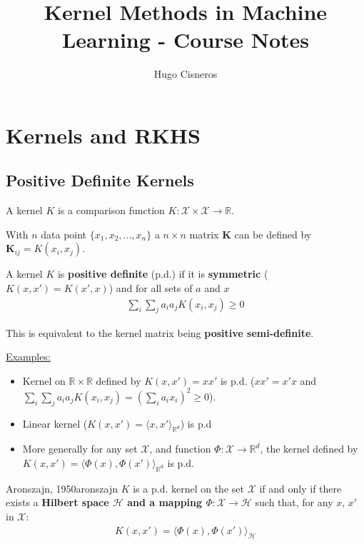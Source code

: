 \documentclass{article}
\title{Kernel Methods in Machine Learning - Course Notes}
\author{Hugo Cisneros}
\date{}
\begin{document}
\maketitle

\section{Kernels and RKHS}

\subsection{Positive Definite Kernels}

\begin{Definition}{}{}
    A kernel $K$ is  a comparison function $K: \mathcal{X}\times\mathcal{X}
 \rightarrow \mathbb{R}$.


    With $n$ data point $\{x_1, x_2, ..., x_n\}$ a $n \times n$ matrix 
    $\mathbf{K}$ can be defined by $\mathbf{K}_{ij} = K(x_i, x_j)$.

    A kernel $K$ is \textbf{positive definite} (p.d.) if it is 
    \textbf{symmetric} ($K(x, x') = K(x', x)$) and for all sets of $a$ and $x$
    \begin{align*}
        \boxed{\sum_i\sum_j a_i a_j K(x_i, x_j) \geq 0}
    \end{align*}
\end{Definition}

This is equivalent to the kernel matrix being \textbf{positive semi-definite}. 

\underline{Examples:}\begin{itemize}
    \item Kernel on $\mathbb{R}\times\mathbb{R}$  defined by 
    $K(x, x') = xx'$ is p.d. ($xx' = x'x$ and $ \sum_i\sum_j a_i a_j 
    K(x_i, x_j) = \left(\sum_i a_i x_i\right)^2 \geq 0$).
    \item Linear kernel ($K(x, x') = \langle x, x'\rangle_{\mathbb{R}^d}$) is 
    p.d 
    \item More generally for any set $\mathcal{X}$, and function $\Phi: 
    \mathcal{X} \rightarrow \mathbb{R}^d$, the kernel defined by $K(x,x') = 
    \langle \Phi(x), \Phi(x') \rangle_{\mathbb{R}^d}$ is p.d.
\end{itemize} 

\begin{Theorem}{Aronszajn, 1950}{aronszajn}
    $K$ is a p.d. kernel on the set $\mathcal{X}$ if and only if there exists a 
    \textbf{Hilbert space $\mathcal{H}$ and a mapping $\Phi : \mathcal{X} 
    \rightarrow \mathcal{H}$} such that, for any $x$, $x'$ in $\mathcal{X}$:
    \begin{align*}
        \boxed{K(x, x') = \langle \Phi(x), \Phi(x') \rangle_\mathcal{H}}
    \end{align*}
\end{Theorem}
\end{document}
